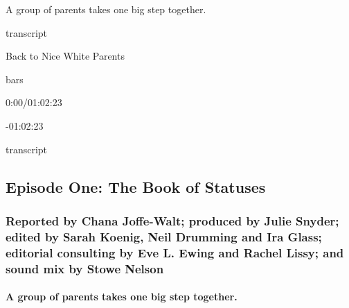 A group of parents takes one big step together.

transcript

Back to Nice White Parents

bars

0:00/01:02:23

-01:02:23

transcript

\hypertarget{episode-one-the-book-of-statuses-1}{%
\subsection{Episode One: The Book of
Statuses}\label{episode-one-the-book-of-statuses-1}}

\hypertarget{reported-by-chana-joffe-walt-produced-by-julie-snyder-edited-by-sarah-koenig-neil-drumming-and-ira-glass-editorial-consulting-by-eve-l-ewing-and-rachel-lissy-and-sound-mix-by-stowe-nelson}{%
\subsubsection{Reported by Chana Joffe-Walt; produced by Julie Snyder;
edited by Sarah Koenig, Neil Drumming and Ira Glass; editorial
consulting by Eve L. Ewing and Rachel Lissy; and sound mix by Stowe
Nelson}\label{reported-by-chana-joffe-walt-produced-by-julie-snyder-edited-by-sarah-koenig-neil-drumming-and-ira-glass-editorial-consulting-by-eve-l-ewing-and-rachel-lissy-and-sound-mix-by-stowe-nelson}}

\hypertarget{a-group-of-parents-takes-one-big-step-together}{%
\paragraph{A group of parents takes one big step
together.}\label{a-group-of-parents-takes-one-big-step-together}}

